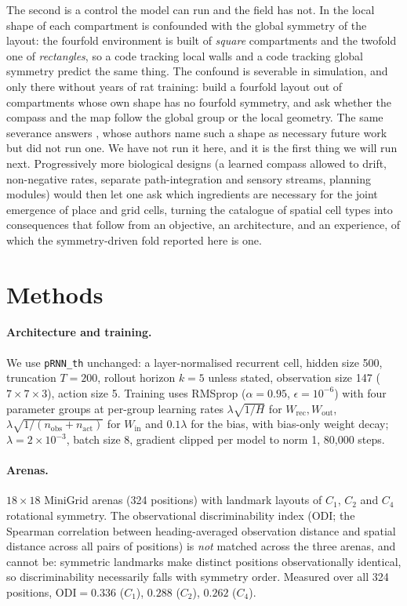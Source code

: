 The second is a control the model can run and the field has not. In \citet{zhang2022} the local shape of
each compartment is confounded with the global symmetry of the layout: the fourfold environment is built
of \emph{square} compartments and the twofold one of \emph{rectangles}, so a code tracking local walls
and a code tracking global symmetry predict the same thing. The confound is severable in simulation, and
only there without years of rat training: build a fourfold layout out of compartments whose own shape has
no fourfold symmetry, and ask whether the compass and the map follow the global group or the local
geometry. The same severance answers \citet{lachance2024}, whose authors name such a shape as necessary
future work but did not run one. We have not run it here, and it is the first thing we will run next.
Progressively more biological designs (a learned compass allowed to drift, non-negative rates, separate
path-integration and sensory streams, planning modules) would then let one ask which ingredients are
necessary for the joint emergence of place and grid cells, turning the catalogue of spatial cell types
into consequences that follow from an objective, an architecture, and an experience, of which the
symmetry-driven fold reported here is one.

\section*{Methods}

\paragraph{Architecture and training.} We use \texttt{pRNN\_th} \citep{levenstein2024} unchanged:
a layer-normalised recurrent cell, hidden size 500, truncation $T = 200$, rollout horizon $k=5$
unless stated, observation size 147 ($7\times7\times3$), action size 5. Training uses RMSprop
($\alpha = 0.95$, $\epsilon = 10^{-6}$) with four parameter groups at per-group learning rates
$\lambda\sqrt{1/H}$ for $W_{\text{rec}}, W_{\text{out}}$, $\lambda\sqrt{1/(n_{\text{obs}} +
n_{\text{act}})}$ for $W_{\text{in}}$ and $0.1\lambda$ for the bias, with bias-only weight decay;
$\lambda = 2\times10^{-3}$, batch size 8, gradient clipped per model to norm 1, 80{,}000 steps.

\paragraph{Arenas.} $18\times18$ MiniGrid arenas (324 positions) with landmark layouts of $C_1$,
$C_2$ and $C_4$ rotational symmetry. The observational discriminability index (ODI; the Spearman
correlation between heading-averaged observation distance and spatial distance across all pairs
of positions) is \emph{not} matched across the three arenas, and cannot be: symmetric landmarks
make distinct positions observationally identical, so discriminability necessarily falls with
symmetry order. Measured over all 324 positions, $\mathrm{ODI} = 0.336$ ($C_1$), $0.288$ ($C_2$),
$0.262$ ($C_4$).

